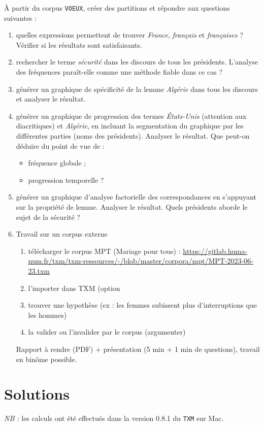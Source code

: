 \documentclass[xcolor={table,usenames,dvipsnames}]{article}
\begin{document}
	À partir du corpus \texttt{VOEUX}, créer des partitions et répondre aux questions suivantes :
	\begin{enumerate}
		\item quelles expressions permettent de trouver \textit{France}, \textit{français} et \textit{françaises} ? Vérifier si les résultats sont satisfaisants.
		\item rechercher le terme \textit{sécurité} dans les discours de tous les présidents. L'analyse des fréquences paraît-elle comme une méthode fiable dans ce cas ?
		\item générer un graphique de spécificité de la lemme \textit{Algérie} dans tous les discours et analyser le résultat.
		\item générer un graphique de progression des termes \textit{États-Unis} (attention aux diacritiques) et \textit{Algérie}, en incluant la segmentation du graphique par les différentes parties (noms des présidents). Analyser le résultat. Que peut-on déduire du point de vue de :
		\begin{itemize}
			\item fréquence globale ;
			\item progression temporelle ?
		\end{itemize}
		\item générer un graphique d'analyse factorielle des correspondances en s'appuyant sur la propriété de lemme. Analyser le résultat. Quels présidents aborde le sujet de la sécurité ?
		\item Travail sur un corpus externe
		\begin{enumerate}
					\item télécharger le corpus \textsc{MPT} (Mariage pour tous) : \url{https://gitlab.huma-num.fr/txm/txm-ressources/-/blob/master/corpora/mpt/MPT-2023-06-23.txm}
			\item l'importer dans \textsc{TXM} (option 
			\item trouver une hypothèse (ex : les femmes subissent plus d’interruptions que les hommes)
			\item la valider ou l’invalider par le corpus (argumenter)
		\end{enumerate}
		Rapport à rendre (PDF) + présentation (5 min + 1 min de questions), travail en binôme possible.
	\end{enumerate}
	
	\bigskip
	
\section{Solutions}
\textit{NB :} les calculs ont été effectués dans la version \textsc{0.8.1} du \texttt{TXM} sur Mac.
\end{document}
